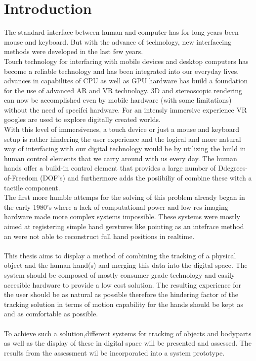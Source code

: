 \chapter{Introduction}
The standard interface between human and computer has for long years been mouse and keyboard. But with the advance of technology, new interfaceing methods were developed in the last few years.\\
Touch technology for interfacing with mobile devices and desktop computers has become a reliable technology and has been integrated into our everyday lives.
advances in capabilites of CPU as well as GPU hardware has build a foundation for the use of advanced AR and VR technology. 3D and stereoscopic rendering can now be accomplished even by mobile hardware (with some limitations) without the need of specifci hardware. For an intensly immersive experience VR googles are used to explore digitally created worlds.\\
With this level of immersivenes, a touch device or just a mouse and keyboard setup is rather hindering the user experience and the logical and more natural way of interfacing with our digital technology would be by utilizing the build in human control elements that we carry around with us every day. The human hands offer a build-in control element that provides a large number of Ddegrees-of-Freedom (DOF's) and furthermore adds the posiibiliy of combine these witch a tactile component.\\The first more humble attemps for the solving of this problem already began in the early 1980's where a lack of computational power and low-res imaging hardware made more complex systems impossible. These systems were mostly aimed at registering simple hand gerstures like pointing as an intefrace method an were not able to reconstruct full hand positions in realtime\cite{Bolt.1980}.\\\\This thesis aims to display a method of combining the tracking of a physical object and the human hand(s) and merging this data into the digital space. The system should be composed of mostly consumer grade technology and easily accesible hardware to provide a low cost solution. The resulting experience for the user should be as natural as possible therefore the hindering factor of the tracking solution in terms of motion capability for the hands should be kept as and as comfortable as possible.\\\\
To achieve such a solution,different systems for tracking of objects and bodyparts as well as the display of these in digital space will be presented and assessed. The results from the assessment wil be incorporated into a system prototype. 
